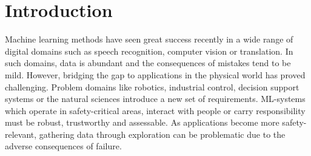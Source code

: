 \chapter{Introduction}
\label{toc:bayesian_ml}





Machine learning methods have seen great success recently in a wide range of digital domains such as speech recognition, computer vision or translation.
In such domains, data is abundant and the consequences of mistakes tend to be mild.
However, bridging the gap to applications in the physical world has proved challenging.
Problem domains like robotics, industrial control, decision support systems or the natural sciences introduce a new set of requirements.
ML-systems which operate in safety-critical areas, interact with people or carry responsibility must be robust, trustworthy and assessable.
As applications become more safety-relevant, gathering data through exploration can be problematic due to the adverse consequences of failure.

